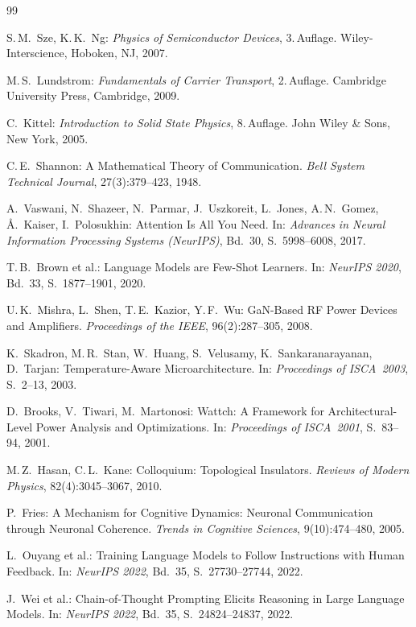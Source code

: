 ﻿\documentclass[a4paper,12pt]{article}
\theoremstyle{definition}
\begin{document}
\begin{thebibliography}{99}

S.\,M.\ Sze, K.\,K.\ Ng:
\textit{Physics of Semiconductor Devices}, 3.\,Auflage.
Wiley-Interscience, Hoboken, NJ, 2007.

M.\,S.\ Lundstrom:
\textit{Fundamentals of Carrier Transport}, 2.\,Auflage.
Cambridge University Press, Cambridge, 2009.

C.\ Kittel:
\textit{Introduction to Solid State Physics}, 8.\,Auflage.
John Wiley \& Sons, New York, 2005.

C.\,E.\ Shannon:
A Mathematical Theory of Communication.
\textit{Bell System Technical Journal}, 27(3):379--423, 1948.

A.\ Vaswani, N.\ Shazeer, N.\ Parmar, J.\ Uszkoreit, L.\ Jones, A.\,N.\ Gomez,
Å.\ Kaiser, I.\ Polosukhin:
Attention Is All You Need.
In: \textit{Advances in Neural Information Processing Systems (NeurIPS)},
Bd.\ 30, S.\ 5998--6008, 2017.

T.\,B.\ Brown et al.:
Language Models are Few-Shot Learners.
In: \textit{NeurIPS 2020}, Bd.\ 33, S.\ 1877--1901, 2020.

U.\,K.\ Mishra, L.\ Shen, T.\,E.\ Kazior, Y.\,F.\ Wu:
GaN-Based RF Power Devices and Amplifiers.
\textit{Proceedings of the IEEE}, 96(2):287--305, 2008.

K.\ Skadron, M.\,R.\ Stan, W.\ Huang, S.\ Velusamy, K.\ Sankaranarayanan,
D.\ Tarjan:
Temperature-Aware Microarchitecture.
In: \textit{Proceedings of ISCA~2003}, S.\ 2--13, 2003.

D.\ Brooks, V.\ Tiwari, M.\ Martonosi:
Wattch: A Framework for Architectural-Level Power Analysis and Optimizations.
In: \textit{Proceedings of ISCA~2001}, S.\ 83--94, 2001.

M.\,Z.\ Hasan, C.\,L.\ Kane:
Colloquium: Topological Insulators.
\textit{Reviews of Modern Physics}, 82(4):3045--3067, 2010.

P.\ Fries:
A Mechanism for Cognitive Dynamics: Neuronal Communication through Neuronal Coherence.
\textit{Trends in Cognitive Sciences}, 9(10):474--480, 2005.

L.\ Ouyang et al.:
Training Language Models to Follow Instructions with Human Feedback.
In: \textit{NeurIPS 2022}, Bd.\ 35, S.\ 27730--27744, 2022.

J.\ Wei et al.:
Chain-of-Thought Prompting Elicits Reasoning in Large Language Models.
In: \textit{NeurIPS 2022}, Bd.\ 35, S.\ 24824--24837, 2022.

\end{thebibliography}
\end{document}
